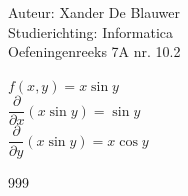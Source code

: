 \documentclass[a4paper]{article}
\begin{document}
\noindent \large Auteur: Xander De Blauwer \\
\noindent \large Studierichting: Informatica\\
\noindent \large Oefeningenreeks 7A nr. 10.2\\

\medskip

\normalsize

$f(x,y) = x \sin y$ \\

$\dfrac{\partial }{\partial x}(x\sin y) = \sin y$ \\

$\dfrac{\partial }{\partial y}(x\sin y) = x \cos y$ \\




\begin{thebibliography}{999}
\end{thebibliography}
\end{document}
